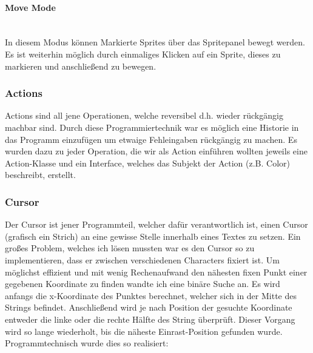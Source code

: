 \paragraph{Move Mode}\ \\
In diesem Modus können Markierte Sprites über das Spritepanel bewegt werden. Es ist weiterhin möglich durch einmaliges Klicken auf ein Sprite, dieses zu markieren und anschließend zu bewegen.

\subsubsection{Actions}

Actions sind all jene Operationen, welche reversibel d.h. wieder rückgängig machbar sind. Durch diese Programmiertechnik war es möglich eine Historie in das Programm einzufügen um etwaige Fehleingaben rückgängig zu machen. Es wurden dazu zu jeder Operation, die wir als Action einführen wollten jeweils eine Action-Klasse und ein Interface, welches das Subjekt der Action (z.B. Color) beschreibt, erstellt.

\subsubsection{Cursor}

Der Cursor ist jener Programmteil, welcher dafür verantwortlich ist, einen Cursor (grafisch ein Strich) an eine gewisse Stelle innerhalb eines Textes zu setzen. Ein großes Problem, welches ich lösen mussten war es den Cursor so zu implementieren, dass er zwischen verschiedenen Characters fixiert ist. Um möglichst effizient und mit wenig Rechenaufwand den nähesten fixen Punkt einer gegebenen Koordinate zu finden wandte ich eine binäre Suche an. Es wird anfangs die x-Koordinate des Punktes berechnet, welcher sich in der Mitte des Strings befindet. Anschließend wird je nach Position der gesuchte Koordinate entweder die linke oder die rechte Hälfte des String überprüft. Dieser Vorgang wird so lange wiederholt, bis die näheste Einrast-Position gefunden wurde.\\
Programmtechnisch wurde dies so realisiert:
